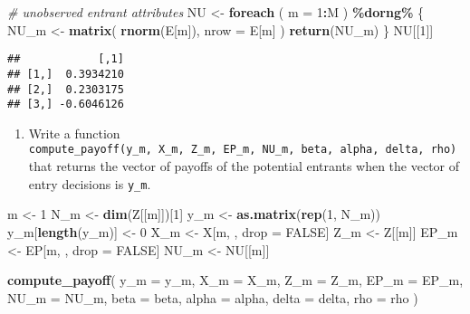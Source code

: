 \documentclass[
]{book}
\newenvironment{Shaded}{\begin{snugshade}}{\end{snugshade}}
\newcommand{\AttributeTok}[1]{\textcolor[rgb]{0.13,0.29,0.53}{#1}}
\newcommand{\CommentTok}[1]{\textcolor[rgb]{0.56,0.35,0.01}{\textit{#1}}}
\newcommand{\ConstantTok}[1]{\textcolor[rgb]{0.56,0.35,0.01}{#1}}
\newcommand{\DecValTok}[1]{\textcolor[rgb]{0.00,0.00,0.81}{#1}}
\newcommand{\FunctionTok}[1]{\textcolor[rgb]{0.13,0.29,0.53}{\textbf{#1}}}
\newcommand{\NormalTok}[1]{#1}
\newcommand{\OtherTok}[1]{\textcolor[rgb]{0.56,0.35,0.01}{#1}}
\newcommand{\SpecialCharTok}[1]{\textcolor[rgb]{0.81,0.36,0.00}{\textbf{#1}}}
\providecommand{\tightlist}{%
  \setlength{\itemsep}{0pt}\setlength{\parskip}{0pt}}
\begin{document}
\begin{Shaded}
\begin{Highlighting}[]
\CommentTok{\# unobserved entrant attributes}
\NormalTok{NU }\OtherTok{\textless{}{-}}
  \FunctionTok{foreach}\NormalTok{ (}
    \AttributeTok{m =} \DecValTok{1}\SpecialCharTok{:}\NormalTok{M}
\NormalTok{    ) }\SpecialCharTok{\%dorng\%}\NormalTok{ \{}
\NormalTok{    NU\_m }\OtherTok{\textless{}{-}} 
      \FunctionTok{matrix}\NormalTok{(}
      \FunctionTok{rnorm}\NormalTok{(E[m]),}
      \AttributeTok{nrow =}\NormalTok{ E[m]}
\NormalTok{    )}
    \FunctionTok{return}\NormalTok{(NU\_m)}
\NormalTok{  \}}
\NormalTok{NU[[}\DecValTok{1}\NormalTok{]]}
\end{Highlighting}
\end{Shaded}

\begin{verbatim}
##            [,1]
## [1,]  0.3934210
## [2,]  0.2303175
## [3,] -0.6046126
\end{verbatim}

\begin{enumerate}
\def\labelenumi{\arabic{enumi}.}
\setcounter{enumi}{3}
\tightlist
\item
  Write a function \texttt{compute\_payoff(y\_m,\ X\_m,\ Z\_m,\ EP\_m,\ NU\_m,\ beta,\ alpha,\ delta,\ rho)} that returns the vector of payoffs of the potential entrants when the vector of entry decisions is \texttt{y\_m}.
\end{enumerate}

\begin{Shaded}
\begin{Highlighting}[]
\NormalTok{m }\OtherTok{\textless{}{-}} \DecValTok{1}
\NormalTok{N\_m }\OtherTok{\textless{}{-}} \FunctionTok{dim}\NormalTok{(Z[[m]])[}\DecValTok{1}\NormalTok{]}
\NormalTok{y\_m }\OtherTok{\textless{}{-}} \FunctionTok{as.matrix}\NormalTok{(}\FunctionTok{rep}\NormalTok{(}\DecValTok{1}\NormalTok{, N\_m))}
\NormalTok{y\_m[}\FunctionTok{length}\NormalTok{(y\_m)] }\OtherTok{\textless{}{-}} \DecValTok{0}
\NormalTok{X\_m }\OtherTok{\textless{}{-}}\NormalTok{ X[m, , drop }\OtherTok{=} \ConstantTok{FALSE}\NormalTok{]}
\NormalTok{Z\_m }\OtherTok{\textless{}{-}}\NormalTok{ Z[[m]]}
\NormalTok{EP\_m }\OtherTok{\textless{}{-}}\NormalTok{ EP[m, , drop }\OtherTok{=} \ConstantTok{FALSE}\NormalTok{]}
\NormalTok{NU\_m }\OtherTok{\textless{}{-}}\NormalTok{ NU[[m]]}


\FunctionTok{compute\_payoff}\NormalTok{(}
  \AttributeTok{y\_m =}\NormalTok{ y\_m, }
  \AttributeTok{X\_m =}\NormalTok{ X\_m, }
  \AttributeTok{Z\_m =}\NormalTok{ Z\_m, }
  \AttributeTok{EP\_m =}\NormalTok{ EP\_m, }
  \AttributeTok{NU\_m =}\NormalTok{ NU\_m, }
  \AttributeTok{beta =}\NormalTok{ beta, }
  \AttributeTok{alpha =}\NormalTok{ alpha, }
  \AttributeTok{delta =}\NormalTok{ delta, }
  \AttributeTok{rho =}\NormalTok{ rho}
\NormalTok{  )}
\end{Highlighting}
\end{Shaded}
\end{document}
